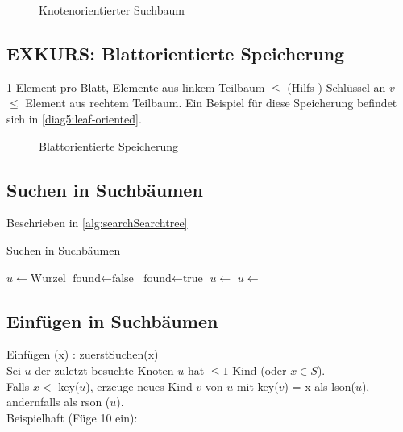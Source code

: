             \begin{figure}[htp]
            	
            	\caption{Knotenorientierter Suchbaum}
            	\label{diag4:search-tree}
            \end{figure}


        \subsection{EXKURS: Blattorientierte Speicherung} 
            1 Element pro Blatt, Elemente aus linkem Teilbaum $\leq$ (Hilfs-) Schlüssel an $v$ $\leq$ Element aus rechtem Teilbaum.
            Ein Beispiel für diese Speicherung befindet sich in \autoref{diag5:leaf-oriented}.
            
            \begin{figure}[htp]
                \centering
                
                \caption{Blattorientierte Speicherung}
                \label{diag5:leaf-oriented}
            \end{figure}
        
       
        
        \subsection{Suchen in Suchbäumen}  
            Beschrieben in \autoref{alg:searchSearchtree}
    	\begin{algorithm}
        		\caption{Suchen in Suchbäumen}
        		\label{alg:searchSearchtree}
        		\begin{algorithmic}[1]
        			    \State $u \gets \text{Wurzel}$
        			    \State $\text{found} \gets \text{false}$
        				        \State $\text{found} \gets \text{true}$
        				    \Else
        				            \State $u \gets $ 
        				        \Else 
        				            \State $u \gets $ 
        				        \EndIf
        				    \EndIf
        				\EndWhile
        				\State {}
        			\EndFunction
        		\end{algorithmic}
        	\end{algorithm}

        \subsection{Einfügen in Suchbäumen}
            Einfügen (x) : zuerstSuchen(x) \\
            Sei $u$ der zuletzt besuchte Knoten $u$ hat $\leq 1$ Kind (oder $x \in S$).\\
            Falls $x < $ key($u$), erzeuge neues Kind $v$ von $u$ mit key($v$) = x als lson($u$), andernfalls als rson ($u$). \\
            Beispielhaft (Füge 10 ein): \\
             \\
        
